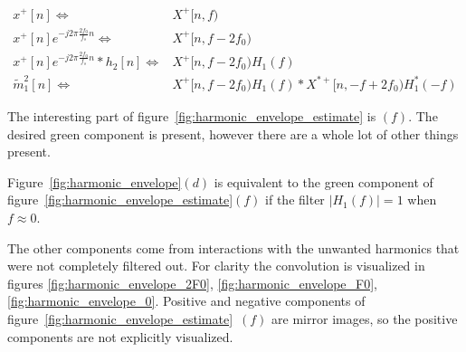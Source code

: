 \documentclass [11pt, proquest,oneside] {ganter_thesis}[2015/03/03]
\begin{document}
\begin{align}
\label{eq:harmonic_estimate_fig_a}
x^+[n] \Longleftrightarrow& X^+[n,f) \\
%
x^+[n]e^{-j2\pi \frac{2f_0}{f_s}n} \Longleftrightarrow& X^+[n,f - 2f_0) \\
%
\label{eq:harmonic_estimate_fig_c}
x^+[n]e^{-j2\pi \frac{2f_0}{f_s}n} * h_2[n] \Longleftrightarrow& X^+[n,f - 2f_0) H_1(f) \\
%
\label{eq:harmonic_estimate_fig_e}
\tilde{m}_1^2[n] \Longleftrightarrow& X^+[n,f - 2f_0) H_1(f) * X^{*+}[n,-f + 2f_0) H_1^*(-f)
\end{align}

The interesting part of figure~\ref{fig:harmonic_envelope_estimate} is $(f)$.  The desired green component is present, however there are a whole lot of other things present.

Figure~\ref{fig:harmonic_envelope}$(d)$ is equivalent to the green component of  figure~\ref{fig:harmonic_envelope_estimate}$(f)$ if the filter $|H_1(f)| = 1$ when $f \approx 0$.

The other components come from interactions with the unwanted harmonics that were not completely filtered out.  For clarity the convolution is visualized in figures \ref{fig:harmonic_envelope_2F0}, \ref{fig:harmonic_envelope_F0}, \ref{fig:harmonic_envelope_0}.  Positive and negative components of figure~\ref{fig:harmonic_envelope_estimate}~$(f)$ are mirror images, so the positive components are not explicitly visualized.
\end{document}
